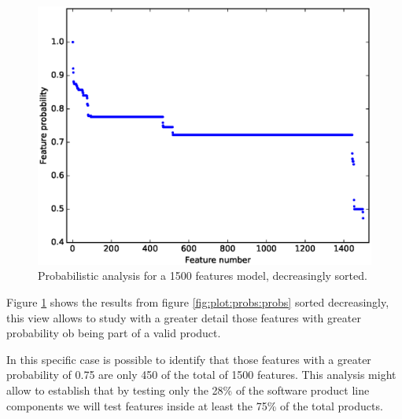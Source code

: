 \begin{figure}[h]
	\centering
	\linefigure
	\includegraphics[width=0.8\hsize,angle=0]{plot_probs_probs_sorted.eps}
	\linefigure
	\caption{Probabilistic analysis for a 1500 features model, decreasingly sorted.}\label{fig:plot:probs:probs:sorted}
\end{figure}

Figure \ref{fig:plot:probs:probs:sorted} shows
the results from figure \ref{fig:plot:probs:probs}
sorted decreasingly, this view allows to study with a greater detail
those features with greater probability ob being part of
a valid product.

In this specific case is possible to identify
that those features with a greater probability of
0.75 are only 450 of the total of 1500 features.
This analysis might allow to establish that
by testing only the 28\% of the software product line components
we will test features inside at least the 75\% of the
total products.


